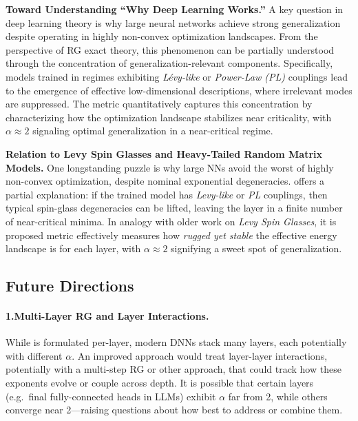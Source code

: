 \vspace{1em}
\noindent
\textbf{Toward Understanding “Why Deep Learning Works.”}
A key question in deep learning theory is why large neural networks achieve strong generalization despite operating in highly non-convex optimization landscapes. From the perspective of RG exact theory, this phenomenon can be partially understood through the concentration of generalization-relevant components. Specifically, models trained in regimes exhibiting \emph{L\'{e}vy-like}
 or \emph{Power-Law (PL)} couplings lead to the emergence of effective low-dimensional descriptions, where irrelevant modes are suppressed. The \WW \ALPHA metric quantitatively captures this concentration by characterizing how the optimization landscape stabilizes near criticality, with $\alpha \approx 2$ signaling optimal generalization in a near-critical regime.

\vspace{1em}
\noindent
\textbf{Relation to Levy Spin Glasses and Heavy-Tailed Random Matrix Models.}
One longstanding puzzle is why large NNs avoid the worst of highly non-convex optimization, despite nominal 
exponential degeneracies. \SETOL offers a partial explanation: if the trained model has \emph{Levy-like} or 
\emph{PL} couplings, then typical spin-glass degeneracies can be lifted, leaving the layer in a finite number 
of near-critical minima. In analogy with older work on \emph{Levy Spin Glasses}\cite{Bouchaud1998},  it is
proposed  \WW \ALPHA  metric effectively measures how \emph{rugged yet stable} the
effective energy landscape is for each layer, with $\alpha\approx 2$ signifying a sweet spot of \Ideal generalization.

\subsection{Future Directions}

\paragraph{1.\quad Multi-Layer RG and Layer Interactions.}
While \SETOL is formulated per-layer, modern DNNs stack many layers, each potentially with different $\alpha$. 
An improved approach would treat layer-layer interactions, potentially with a multi-step RG or other
approach, that could track how these exponents evolve or couple across depth. It is possible 
that certain layers (e.g.\ final fully-connected heads in LLMs) exhibit $\alpha$ far from 2, while others 
converge near 2---raising questions about how best to address or combine them.

